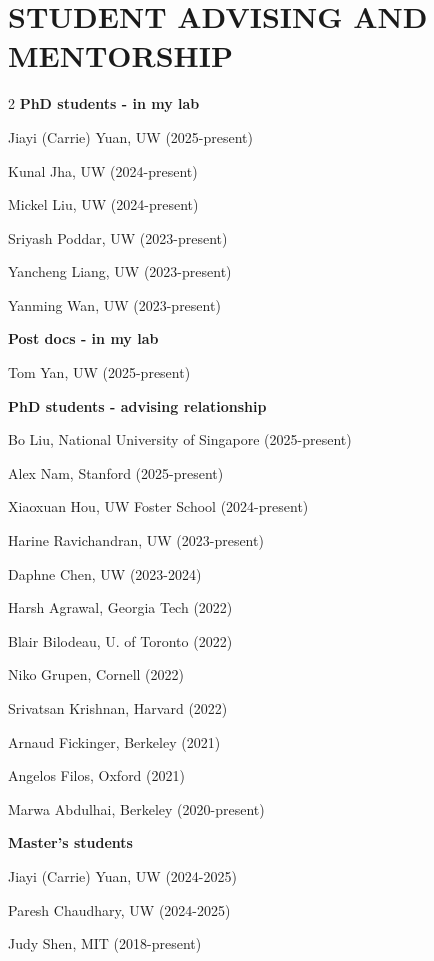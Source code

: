 \documentclass[paper=letter,fontsize=11pt]{scrartcl} %
\newcommand{\NewPart}[2]{\section*{\uppercase{#1} #2}}
\begin{document}
\NewPart{Student Advising and Mentorship}{}
\begin{multicols}{2}
\noindent \textbf{PhD students - in my lab}
\begin{etaremune}
    \item Jiayi (Carrie) Yuan, UW (2025-present)
    \item Kunal Jha, UW (2024-present)
    \item Mickel Liu, UW (2024-present)
    \item Sriyash Poddar, UW (2023-present)
    \item Yancheng Liang, UW (2023-present)
    \item Yanming Wan, UW (2023-present)    
\end{etaremune}

\noindent \textbf{Post docs - in my lab}
\begin{etaremune}
    \item Tom Yan, UW (2025-present)
\end{etaremune}

\noindent \textbf{PhD students - advising relationship}
\begin{etaremune}
    \item Bo Liu, National University of Singapore (2025-present)
    \item Alex Nam, Stanford (2025-present)
    \item Xiaoxuan Hou, UW Foster School (2024-present)
    \item Harine Ravichandran, UW (2023-present)
    \item Daphne Chen, UW (2023-2024)
    \item Harsh Agrawal, Georgia Tech (2022)
    \item Blair Bilodeau, U. of Toronto (2022)
    \item Niko Grupen, Cornell (2022)
    \item Srivatsan Krishnan, Harvard (2022)
    \item Arnaud Fickinger, Berkeley (2021)
    \item Angelos Filos, Oxford (2021)
    \item Marwa Abdulhai, Berkeley (2020-present)
\end{etaremune}

\noindent \textbf{Master's students}
\begin{etaremune}
    \item Jiayi (Carrie) Yuan, UW (2024-2025)
    \item Paresh Chaudhary, UW (2024-2025)
    \item Judy Shen, MIT (2018-present)
\end{etaremune}


\end{multicols}
\end{document}
